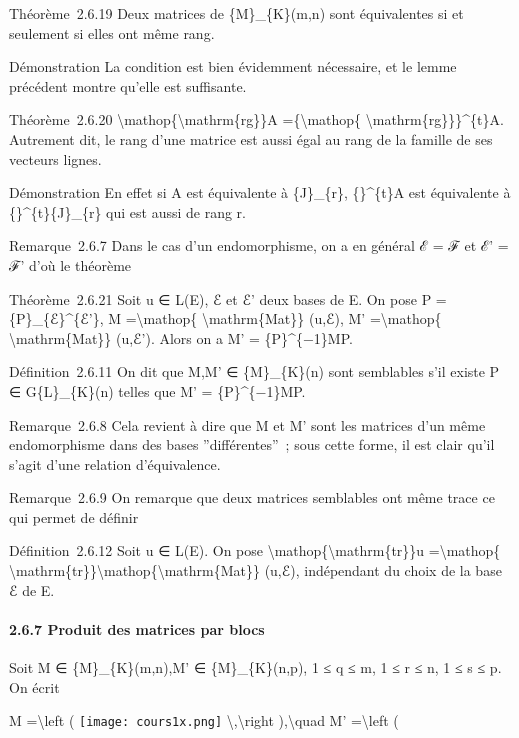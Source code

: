 \documentclass[]{article}
\begin{document}
Théorème~2.6.19 Deux matrices de \{M\}\_\{K\}(m,n) sont équivalentes si
et seulement si elles ont même rang.

Démonstration La condition est bien évidemment nécessaire, et le lemme
précédent montre qu'elle est suffisante.

Théorème~2.6.20 \textbackslash{}mathop\{\textbackslash{}mathrm\{rg\}\}A
=\{\textbackslash{}mathop\{ \textbackslash{}mathrm\{rg\}\}\}\^{}\{t\}A.
Autrement dit, le rang d'une matrice est aussi égal au rang de la
famille de ses vecteurs lignes.

Démonstration En effet si A est équivalente à \{J\}\_\{r\},
\{\}\^{}\{t\}A est équivalente à \{\}\^{}\{t\}\{J\}\_\{r\} qui est aussi
de rang r.

Remarque~2.6.7 Dans le cas d'un endomorphisme, on a en général ℰ = ℱ et
ℰ' = ℱ' d'où le théorème

Théorème~2.6.21 Soit u ∈ L(E), ℰ et ℰ' deux bases de E. On pose P =
\{P\}\_\{ℰ\}\^{}\{ℰ'\}, M =\textbackslash{}mathop\{
\textbackslash{}mathrm\{Mat\}\} (u,ℰ), M' =\textbackslash{}mathop\{
\textbackslash{}mathrm\{Mat\}\} (u,ℰ'). Alors on a M' =
\{P\}\^{}\{−1\}MP.

Définition~2.6.11 On dit que M,M' ∈ \{M\}\_\{K\}(n) sont semblables s'il
existe P ∈ G\{L\}\_\{K\}(n) telles que M' = \{P\}\^{}\{−1\}MP.

Remarque~2.6.8 Cela revient à dire que M et M' sont les matrices d'un
même endomorphisme dans des bases ''différentes''~; sous cette forme, il
est clair qu'il s'agit d'une relation d'équivalence.

Remarque~2.6.9 On remarque que deux matrices semblables ont même trace
ce qui permet de définir

Définition~2.6.12 Soit u ∈ L(E). On pose
\textbackslash{}mathop\{\textbackslash{}mathrm\{tr\}\}u
=\textbackslash{}mathop\{
\textbackslash{}mathrm\{tr\}\}\textbackslash{}mathop\{\textbackslash{}mathrm\{Mat\}\}
(u,ℰ), indépendant du choix de la base ℰ de E.

\paragraph{2.6.7 Produit des matrices par blocs}

Soit M ∈ \{M\}\_\{K\}(m,n),M' ∈ \{M\}\_\{K\}(n,p), 1 ≤ q ≤ m, 1 ≤ r ≤ n,
1 ≤ s ≤ p. On écrit

M =\textbackslash{}left ( \texttt{[image: cours1x.png]}
\textbackslash{},\textbackslash{}right ),\textbackslash{}quad M'
=\textbackslash{}left (
\end{document}
